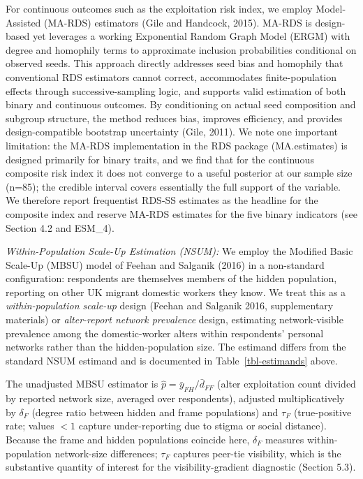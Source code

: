 \documentclass[
  12pt,
  letterpaper,
  DIV=11,
  numbers=noendperiod]{scrartcl}
\begin{document}
For continuous outcomes such as the exploitation risk index, we employ
Model-Assisted (MA-RDS) estimators (Gile and Handcock, 2015). MA-RDS is
design-based yet leverages a working Exponential Random Graph Model
(ERGM) with degree and homophily terms to approximate inclusion
probabilities conditional on observed seeds. This approach directly
addresses seed bias and homophily that conventional RDS estimators
cannot correct, accommodates finite-population effects through
successive-sampling logic, and supports valid estimation of both binary
and continuous outcomes. By conditioning on actual seed composition and
subgroup structure, the method reduces bias, improves efficiency, and
provides design-compatible bootstrap uncertainty (Gile, 2011). We note
one important limitation: the MA-RDS implementation in the RDS package
(MA.estimates) is designed primarily for binary traits, and we find that
for the continuous composite risk index it does not converge to a useful
posterior at our sample size (n=85); the credible interval covers
essentially the full support of the variable. We therefore report
frequentist RDS-SS estimates as the headline for the composite index and
reserve MA-RDS estimates for the five binary indicators (see Section 4.2
and ESM\_4).

\emph{Within-Population Scale-Up Estimation (NSUM):} We employ the
Modified Basic Scale-Up (MBSU) model of Feehan and Salganik (2016) in a
non-standard configuration: respondents are themselves members of the
hidden population, reporting on other UK migrant domestic workers they
know. We treat this as a \emph{within-population scale-up} design
(Feehan and Salganik 2016, supplementary materials) or
\emph{alter-report network prevalence} design, estimating
network-visible prevalence among the domestic-worker alters within
respondents' personal networks rather than the hidden-population size.
The estimand differs from the standard NSUM estimand and is documented
in Table~\ref{tbl-estimands} above.

The unadjusted MBSU estimator is
\(\hat{p} = \bar{y}_{FH} / \bar{d}_{FF}\) (alter exploitation count
divided by reported network size, averaged over respondents), adjusted
multiplicatively by \(\delta_F\) (degree ratio between hidden and frame
populations) and \(\tau_F\) (true-positive rate; values \(< 1\) capture
under-reporting due to stigma or social distance). Because the frame and
hidden populations coincide here, \(\delta_F\) measures
within-population network-size differences; \(\tau_F\) captures peer-tie
visibility, which is the substantive quantity of interest for the
visibility-gradient diagnostic (Section 5.3).
\end{document}
